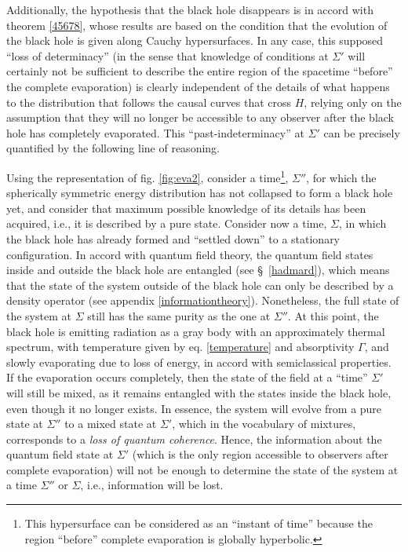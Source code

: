 \documentclass[
12pt,		%
openright,	%
twoside,  %
a4paper,			%
chapter=TITLE,		%
english,			%
french,				%
spanish,			%
brazil				%
]{USPSC-classe/USPSC}
\begin{document}
Additionally, the hypothesis that the black hole disappears is in accord with theorem \ref{45678}, whose results are based on the condition that the evolution of the black hole is given along Cauchy hypersurfaces. In any case, this supposed ``loss of determinacy'' (in the sense that knowledge of conditions at $\Sigma'$ will certainly not be sufficient to describe the entire region of the spacetime ``before'' the complete evaporation) is clearly independent of the details of what happens to the distribution that follows the causal curves that cross $H$, relying only on the assumption that they will no longer be accessible to any observer after the black hole has completely evaporated. This ``past-indeterminacy'' at $\Sigma'$ can be precisely quantified by the following line of reasoning. 

Using the representation of fig. \ref{fig:eva2}, consider a time\footnote{This hypersurface can be considered as an ``instant of time'' because the region ``before'' complete evaporation is globally hyperbolic.}, $\Sigma''$, for which the spherically symmetric energy distribution has not collapsed to form a black hole yet, and consider that maximum possible knowledge of its details has been acquired, i.e., it is described by a pure state. Consider now a time, $\Sigma$, in which the black hole has already formed and ``settled down'' to a stationary configuration. In accord with quantum field theory, the quantum field states inside and outside the black hole are entangled (see \S~\ref{hadmard}), which means that the state of the system outside of the black hole can only be described by a density operator (see appendix \ref{informationtheory}). Nonetheless, the full state of the system at $\Sigma$ still has the same purity as the one at $\Sigma''$. At this point, the black hole is emitting radiation as a gray body with an approximately thermal spectrum, with temperature given by eq. \ref{temperature} and absorptivity $\Gamma$, and slowly evaporating due to loss of energy, in accord with semiclassical properties. If the evaporation occurs completely, then the state of the field at a ``time'' $\Sigma'$ will still be mixed, as it remains entangled with the states inside the black hole, even though it no longer exists. In essence, the system will evolve from a pure state at $\Sigma''$ to a mixed state at $\Sigma'$, which in the vocabulary of mixtures, corresponds to a \textit{loss of quantum coherence}. Hence, the information about the quantum field state at $\Sigma'$ (which is the only region accessible to observers after complete evaporation) will not be enough to determine the state of the system at a time $\Sigma''$ or $\Sigma$, i.e., information will be lost. 
\end{document}
